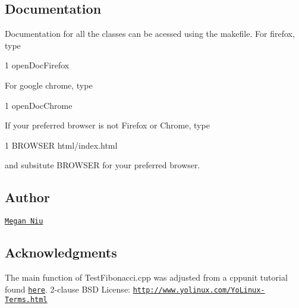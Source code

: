 \subsection*{Documentation}

Documentation for all the classes can be acessed using the makefile. For firefox, type


\begin{DoxyCode}
1 openDocFirefox
\end{DoxyCode}
 For google chrome, type 
\begin{DoxyCode}
1 openDocChrome
\end{DoxyCode}
 If your preferred browser is not Firefox or Chrome, type 
\begin{DoxyCode}
1 BROWSER html/index.html
\end{DoxyCode}
 and subsitute {\ttfamily B\+R\+O\+W\+S\+ER} for your preferred browser.

\subsection*{Author}

\href{https://github.com/meganniu}{\tt Megan Niu}

\subsection*{Acknowledgments}

The {\ttfamily main} function of {\ttfamily Test\+Fibonacci.\+cpp} was adjusted from a cppunit tutorial found \href{yolinux.com/TUTORIALS/CppUnit.html}{\tt here}. 2-\/clause B\+SD License\+: \href{http://www.yolinux.com/YoLinux-Terms.html}{\tt http\+://www.\+yolinux.\+com/\+Yo\+Linux-\/\+Terms.\+html} 